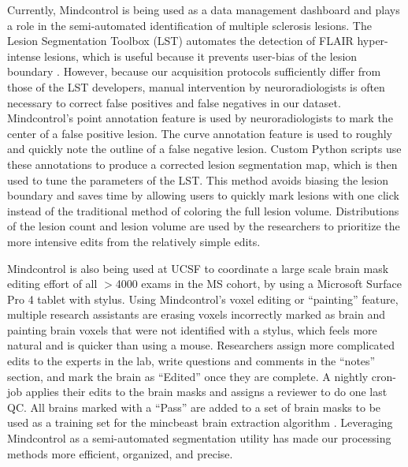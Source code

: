 Currently, Mindcontrol is being used as a data management dashboard and plays a role in the semi-automated identification of multiple sclerosis lesions. The Lesion Segmentation Toolbox (LST) automates the detection of FLAIR hyper-intense lesions, which is useful because it prevents user-bias of the lesion boundary \cite{Schmidt_2012}. However, because our acquisition protocols sufficiently differ from those of the LST developers, manual intervention by neuroradiologists is often necessary to correct false positives and false negatives in our dataset. Mindcontrol's point annotation feature is used by neuroradiologists to mark the center of a false positive lesion. The curve annotation feature is used to roughly and quickly note the outline of a false negative lesion. Custom Python scripts use these annotations to produce a corrected lesion segmentation map, which is then used to tune the parameters of the LST. This method avoids biasing the lesion boundary and saves time by allowing users to quickly mark lesions with one click instead of the traditional method of coloring the full lesion volume. Distributions of the lesion count and lesion volume are used by the researchers to prioritize the more intensive edits from the relatively simple edits.

Mindcontrol is also being used at UCSF to coordinate a large scale brain mask editing effort of all $>$4000 exams in the MS cohort, by using a Microsoft Surface Pro 4 tablet with stylus. Using Mindcontrol's voxel editing or ``painting'' feature, multiple research assistants are erasing voxels incorrectly marked as brain and painting brain voxels that were not identified with a stylus, which feels more natural and is quicker than using a mouse. Researchers assign more complicated edits to the experts in the lab, write questions and comments in the ``notes'' section, and mark the brain as ``Edited'' once they are complete. A nightly cron-job applies their edits to the brain masks and assigns a reviewer to do one last QC. All brains marked with a ``Pass'' are added to a set of brain masks to be  used as a training set for the mincbeast brain extraction algorithm \cite{eskildsen2012beast}. Leveraging Mindcontrol as a semi-automated segmentation utility has made our processing methods more efficient, organized, and precise.





